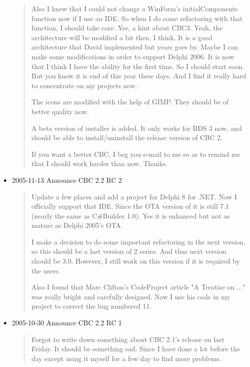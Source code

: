 \begin{itemize}
\begin{quotation}
    Also I knew that I could not change a WinForm's initialComponents
    function now if I use an IDE. So when I do some refactoring with that
    function, I should take care. Yes, a hint about CBC3. Yeah, the
    architecture will be modified a bit then, I think. It is a good
    architecture that David implemented but years goes by. Maybe I can
    make some modifications in order to support Delphi 2006. It is now
    that I think I have the ability for the first time. So I should start
    soon. But you know it is end of this year these days. And I find it
    really hard to concentrate on my projects now.

    The icons are modified with the help of GIMP. They should be of
    better quality now.

    A beta version of installer is added. It only works for BDS 3 now,
    and should be able to install/uninstall the release version of CBC 2.

    If you want a better CBC, I beg you e-mail to me so as to remind me
    that I should work harder than now. Thanks.
  \end{quotation}

  \item 2005-11-13 Announce CBC 2.2 RC 2

  \begin{quotation}
    Update a few places and add a project for Delphi 8 for .NET. Now I
    officially support that IDE. Since the OTA version of it is still
    7.1 (nearly the same as C\#Builder 1.0). Yes it is enhanced but not
    as mature as Delphi 2005's OTA.

    I make a decision to do some important refactoring in the next
    version, so this should be a last version of 2 series. And thus
    next version should be 3.0. However, I still work on this version
    if it is required by the users.

    Also I found that Marc Clifton's CodeProject article "A Treatise on
    ..." was really bright and carefully designed. Now I use his code in
    my project to correct the bug numbered 11.

  \end{quotation}

  \item 2005-10-30 Announce CBC 2.2 RC 1

  \begin{quotation}
    Forgot to write down something about CBC 2.1's release on last
    Friday. It should be something sad. Since I have done a lot before
    the day except using it myself for a few day to find more problems.


\end{quotation}
\end{itemize}
